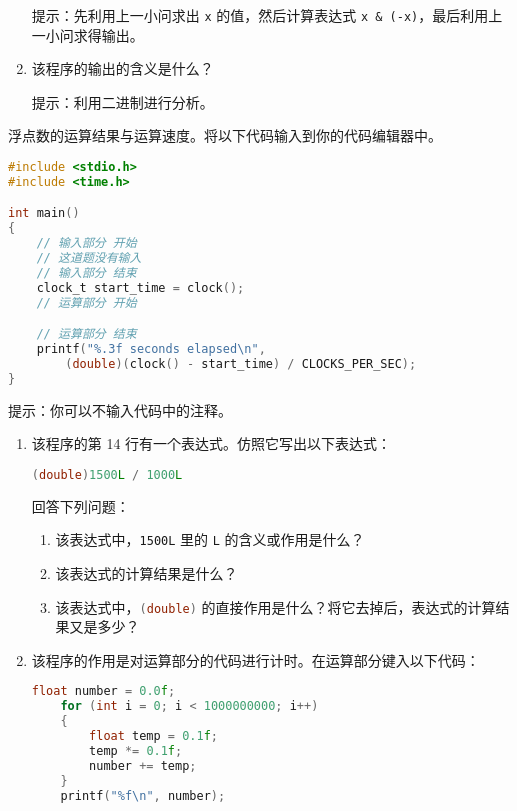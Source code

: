 \begin{problemset}
\begin{enumerate}
		提示：先利用上一小问求出 \lstinline{x} 的值，然后计算表达式 \lstinline{x & (-x)}，最后利用上一小问求得输出。

		\item 该程序的输出的含义是什么？

		提示：利用二进制进行分析。
	\end{enumerate}

	\item 浮点数的运算结果与运算速度。将以下代码输入到你的代码编辑器中。

	\begin{lstlisting}[language=c, moreemph={[1]clock_t}, moreemph={[2]clock}, moreemph={[3]CLOCKS_PER_SEC}]
#include <stdio.h>
#include <time.h>

int main()
{
	// 输入部分 开始
	// 这道题没有输入
	// 输入部分 结束
	clock_t start_time = clock();
	// 运算部分 开始

	// 运算部分 结束
	printf("%.3f seconds elapsed\n",
		(double)(clock() - start_time) / CLOCKS_PER_SEC);
}
	\end{lstlisting}

	提示：你可以不输入代码中的注释。

	\begin{enumerate}
		\item 该程序的第 14 行有一个表达式。仿照它写出以下表达式：

		\begin{lstlisting}[language=c, numbers=none]
(double)1500L / 1000L
		\end{lstlisting}

		回答下列问题：
		\begin{enumerate}
			\item 该表达式中，\lstinline{1500L} 里的 \lstinline{L} 的含义或作用是什么？
			\item 该表达式的计算结果是什么？
			\item 该表达式中，\lstinline[language=c]{(double)} 的直接作用是什么？将它去掉后，表达式的计算结果又是多少？
		\end{enumerate}

		\item 该程序的作用是对运算部分的代码进行计时。在运算部分键入以下代码：

		\begin{lstlisting}[language=c, firstnumber=11]
	float number = 0.0f;
	for (int i = 0; i < 1000000000; i++)
	{
		float temp = 0.1f;
		temp *= 0.1f;
		number += temp;
	}
	printf("%f\n", number);
		\end{lstlisting}


\end{enumerate}
\end{problemset}
